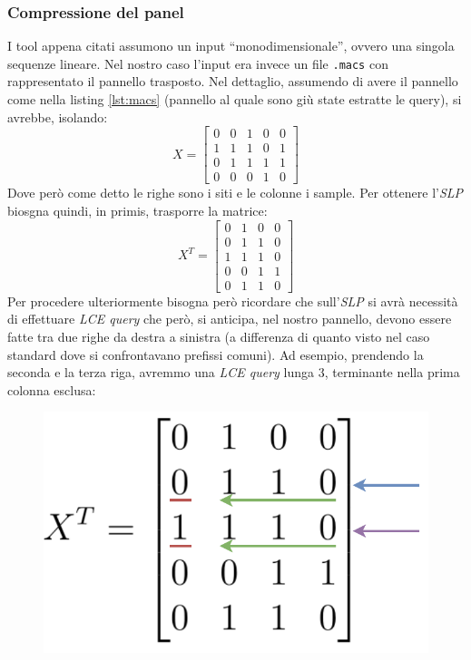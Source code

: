 \subsubsection{Compressione del panel}
I tool appena citati assumono un input ``monodimensionale'', ovvero una singola
sequenze lineare. Nel nostro caso l'input era invece un file \texttt{.macs} con
rappresentato il pannello trasposto. Nel dettaglio, assumendo di avere il
pannello come nella listing \ref{lst:macs} (pannello al quale sono giù state
estratte le query), si avrebbe, isolando:
\[
  X=\left[
    \begin{matrix}
      0 & 0 & 1 & 0 & 0\\
      1 & 1 & 1 & 0 & 1\\
      0 & 1 & 1 & 1 & 1\\
      0 & 0 & 0 & 1 & 0
    \end{matrix}
  \right]
\]
Dove però come detto le righe sono i siti e le colonne i sample. Per ottenere
l'\textit{SLP} biosgna quindi, in primis, trasporre la matrice:
\[
  X^T=\left[
    \begin{matrix}
      0 & 1 & 0 & 0\\
      0 & 1 & 1 & 0\\
      1 & 1 & 1 & 0\\
      0 & 0 & 1 & 1\\
      0 & 1 & 1 & 0
    \end{matrix}
  \right]
\]
Per procedere ulteriormente bisogna però ricordare che sull'\textit{SLP} si avrà
necessità di effettuare \textit{LCE query} che però, si anticipa, nel nostro
pannello, devono essere fatte tra due righe da destra a sinistra (a differenza
di quanto visto nel caso standard dove si confrontavano prefissi comuni). Ad
esempio, prendendo la seconda e la terza riga, avremmo una \textit{LCE query}
lunga 3, terminante nella prima colonna esclusa:
\begin{figure}[H]
  \centering
  \includegraphics[scale = 0.38]{img/slppanel.pdf}
\end{figure}
